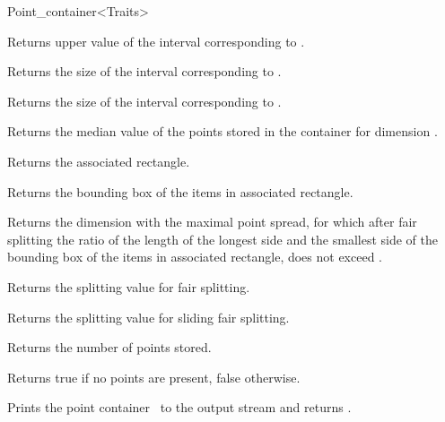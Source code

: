 \begin{ccRefClass}{Point_container<Traits>}
\begin{ccAdvanced}
{
Returns upper value of the interval corresponding to
.
}

{
Returns the size of the interval corresponding to .
}

{
Returns the size of the interval corresponding to .
}

{
Returns the median value of the points stored in the container for
dimension .
}

{Returns the associated rectangle.}

{Returns the bounding box of the items in associated rectangle.}

{Returns the dimension with the maximal point spread, for which after fair splitting
the ratio of the length of the longest side and the smallest side of the bounding box of
the items in associated rectangle,
does not exceed .}

{Returns the splitting value for fair splitting.}

{Returns the splitting value for sliding fair splitting.}

{
Returns the number of points stored.
}

{
Returns true if no points are present, false otherwise.
}





{Prints the point container \ccVar\ to the output stream  and returns .}


\ccSeeAlso

\\

\end{ccAdvanced}
\end{ccRefClass}


